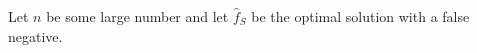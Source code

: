 \message{ !name(derivations.tex)}\documentclass{article}
\begin{document}
Let $n$ be some large number and let $\hat{f}_S$ be the optimal solution with a false negative.
\end{document}

